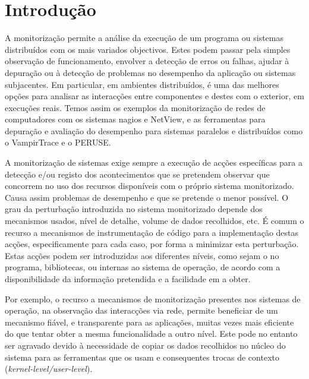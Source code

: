 \documentclass[a4paper]{llncs}
\begin{document}
\section{Introdução}
\label{sec:introduction}

A monitorização permite a análise da execução de um programa ou sistemas distribuídos com os mais variados objectivos. Estes podem passar pela simples observação de funcionamento, envolver a detecção de erros ou falhas, ajudar à depuração ou à detecção de problemas no desempenho da aplicação ou sistemas subjacentes. Em particular, em ambientes distribuídos, é uma das melhores opções para analisar as interacções entre componentes e destes com o exterior, em execuções reais. 
Temos assim os exemplos da monitorização de redes de computadores com os sistemas  nagios e NetView, e as ferramentas para depuração e avaliação do desempenho para sistemas paralelos e distribuídos como o VampirTrace\cite{vampir:2008} e o PERUSE\cite{keller06}.




A monitorização de sistemas exige sempre a execução de acções específicas para a detecção e/ou registo dos acontecimentos que se pretendem observar que concorrem no uso dos recursos disponíveis com o próprio sistema monitorizado. Causa assim problemas de desempenho e que se pretende o menor possível. O grau da perturbação introduzida no sistema monitorizado depende dos mecanismos usados, nível de detalhe, volume de dados recolhidos, etc.  
É comum o recurso a mecanismos de instrumentação de código para a implementação destas acções, especificamente para cada caso, por forma a minimizar esta perturbação. Estas acções podem ser introduzidas aos diferentes níveis, como sejam o no programa, bibliotecas, ou internas ao sistema de operação, de acordo com a disponibilidade da informação pretendida e a facilidade em a obter.

Por exemplo, o recurso a mecanismos de monitorização presentes nos sistemas de operação, na observação das interacções via rede, permite beneficiar de um mecanismo fiável, e transparente para as aplicações, muitas vezes mais eficiente do que tentar obter a mesma funcionalidade a outro nível. Este pode no entanto ser agravado devido à necessidade de copiar os dados recolhidos no núcleo do sistema para as ferramentas que os usam e consequentes trocas de contexto (\emph{kernel-level/user-level}).
\end{document}
